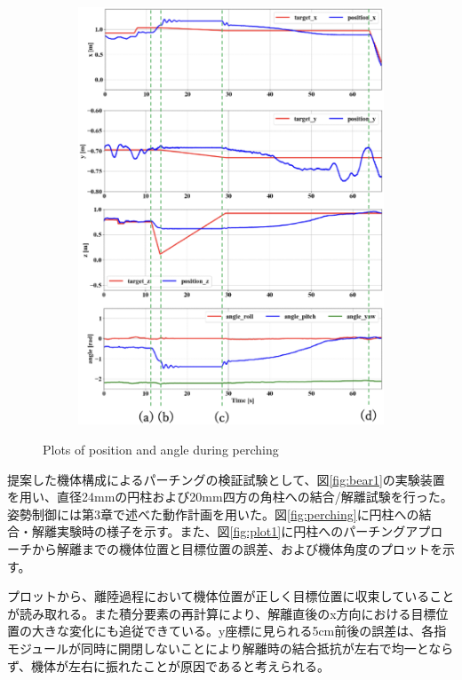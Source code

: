 \documentclass{jarticle}
\begin{document}
\begin{figure}[h]
\begin{subfigure}{0.38\columnwidth}
    \includegraphics[width=\textwidth]{figs/plot2.eps}
    \vspace{-6mm}
    \caption{}
    \label{fig:plot2}
  \end{subfigure}
  \vspace{1mm}
  \caption{Plots of position and angle during perching}
  \label{fig:plot}
  \vspace{-2mm}
\end{figure}
提案した機体構成によるパーチングの検証試験として、図\ref{fig:bear1}の実験装置を用い、直径24mmの円柱および20mm四方の角柱への結合/解離試験を行った。姿勢制御には第3章で述べた動作計画を用いた。図\ref{fig:perching}に円柱への結合・解離実験時の様子を示す。また、図\ref{fig:plot1}に円柱へのパーチングアプローチから解離までの機体位置と目標位置の誤差、および機体角度のプロットを示す。

プロットから、離陸過程において機体位置が正しく目標位置に収束していることが読み取れる。また積分要素の再計算により、解離直後のx方向における目標位置の大きな変化にも追従できている。y座標に見られる5cm前後の誤差は、各指モジュールが同時に開閉しないことにより解離時の結合抵抗が左右で均一とならず、機体が左右に振れたことが原因であると考えられる。
\end{document}
